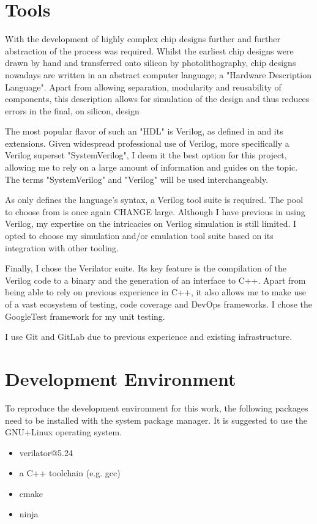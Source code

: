 \section{Tools}
With the development of highly complex chip designs further and further abstraction of the process was required. Whilst the earliest chip designs were drawn by hand and transferred onto silicon by photolithography, chip designs nowadays are written in an abstract computer language; a "Hardware Description Language". Apart from allowing separation, modularity and reusability of components, this description allows for simulation of the design and thus reduces errors in the final, on silicon, design 

The most popular flavor of such an "HDL" is Verilog, as defined in \cite{10458102} and its extensions. Given widespread professional use of Verilog, more specifically a Verilog superset "SystemVerilog", I deem it the best option for this project, allowing me to rely on a large amount of information and guides on the topic. The terms "SystemVerilog" and "Verilog" will be used interchangeably. 

As \cite{10458102} only defines the language's syntax, a Verilog tool suite is required. The pool to choose from is once again CHANGE large. Although I have previous in using Verilog, my expertise on the intricacies on Verilog simulation is still limited. I opted to choose my simulation and/or emulation tool suite based on its integration with other tooling.

Finally, I chose the Verilator suite. Its key feature is the compilation of the Verilog code to a binary and the 
generation of an interface to C++. Apart from being able to rely on previous experience in C++, it also allows me to make use of a vast ecosystem of testing, code coverage and DevOps frameworks. I chose the GoogleTest framework for my unit testing. 

I use Git and GitLab due to previous experience and existing infrastructure. 
  
\section{Development Environment}
To reproduce the development environment for this work, the following packages need to be installed with the system package manager. It is suggested to use the GNU+Linux operating system. 

\begin{itemize}
  \item verilator@5.24
  \item a C++ toolchain (e.g. gcc)
  \item cmake
  \item ninja
\end{itemize}
  

